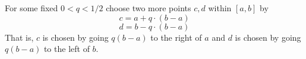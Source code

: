 \documentclass[17pt]{extarticle}
\begin{document}
For some fixed $0<q<1/2$ choose two more points $c, d$
within $[a,b]$ by
$$
c = a + q\cdot(b-a)
$$
$$
d= b - q\cdot(b-a)
$$
That is, $c$ is chosen by going $q(b-a)$ to the right of $a$ and
$d$ is chosen by going $q(b-a)$ to the left of $b$.
\end{document}
